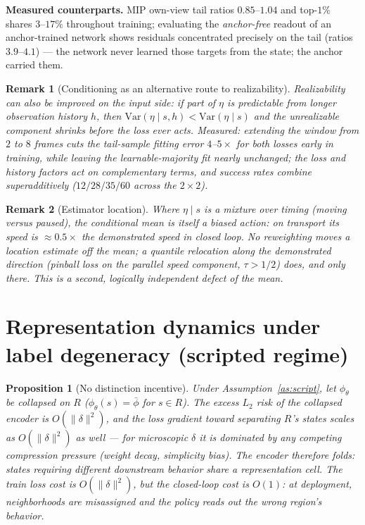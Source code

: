 \documentclass[11pt]{article}
\newtheorem{proposition}{Proposition}
\newtheorem{remark}{Remark}
\newcommand{\enc}{\phi_\theta}
\begin{document}
\noindent\textbf{Measured counterparts.} MIP own-view tail ratios $0.85$--$1.04$
and top-$1\%$ shares $3$--$17\%$ throughout training; evaluating the
\emph{anchor-free} readout of an anchor-trained network shows residuals
concentrated precisely on the tail (ratios $3.9$--$4.1$) --- the network never
learned those targets from the state; the anchor carried them.

\begin{remark}[Conditioning as an alternative route to realizability]
Realizability can also be improved on the input side: if part of $\eta$ is
predictable from longer observation history $h$, then
$\mathrm{Var}(\eta \mid s, h) < \mathrm{Var}(\eta \mid s)$ and the unrealizable
component shrinks before the loss ever acts. Measured: extending the window from
$2$ to $8$ frames cuts the tail-sample fitting error $4$--$5\times$ for
\emph{both} losses early in training, while leaving the learnable-majority fit
nearly unchanged; the loss and history factors act on complementary terms, and
success rates combine superadditively ($12/28/35/60$ across the $2\times2$).
\end{remark}

\begin{remark}[Estimator location]
Where $\eta \mid s$ is a mixture over timing (moving versus paused), the
conditional mean is itself a biased action: on transport its speed is
$\approx 0.5\times$ the demonstrated speed in closed loop. No reweighting moves
a location estimate off the mean; a quantile relocation along the demonstrated
direction (pinball loss on the parallel speed component, $\tau > 1/2$) does,
and only there. This is a second, logically independent defect of the mean.
\end{remark}

\section{Representation dynamics under label degeneracy (scripted regime)}

\begin{proposition}[No distinction incentive]\label{prop:fold}
Under Assumption~\ref{as:script}, let $\enc$ be \emph{collapsed on $R$}
($\enc(s) = \bar\phi$ for $s \in R$). The excess $L_2$ risk of the collapsed
encoder is $O(\|\delta\|^2)$, and the loss gradient toward separating $R$'s
states scales as $O(\|\delta\|^2)$ as well --- for microscopic $\delta$ it is
dominated by any competing compression pressure (weight decay, simplicity bias).
The encoder therefore folds: states requiring different downstream behavior
share a representation cell. The train loss cost is $O(\|\delta\|^2)$, but the
closed-loop cost is $O(1)$: at deployment, neighborhoods are misassigned and the
policy reads out the wrong region's behavior.
\end{proposition}
\end{document}
